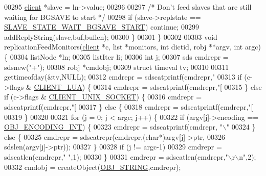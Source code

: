 \begin{DoxyCode}
{{{{{00295         \hyperlink{structclient}{client} *slave = ln->value;
00296 
00297         \textcolor{comment}{/* Don't feed slaves that are still waiting for BGSAVE to start */}
00298         \textcolor{keywordflow}{if} (slave->replstate == \hyperlink{server_8h_a170ee2dd8cfefaf0d112edcc3152f8d7}{SLAVE\_STATE\_WAIT\_BGSAVE\_START}) \textcolor{keywordflow}{continue};
00299         addReplyString(slave,buf,buflen);
00300     \}
00301 \}
00302 
00303 \textcolor{keywordtype}{void} replicationFeedMonitors(\hyperlink{structclient}{client} *c, list *monitors, \textcolor{keywordtype}{int} dictid, robj **argv, \textcolor{keywordtype}{int} argc) \{
00304     listNode *ln;
00305     listIter li;
00306     \textcolor{keywordtype}{int} j;
00307     sds cmdrepr = sdsnew(\textcolor{stringliteral}{"+"});
00308     robj *cmdobj;
00309     \textcolor{keyword}{struct} timeval tv;
00310 
00311     gettimeofday(&tv,NULL);
00312     cmdrepr = sdscatprintf(cmdrepr,\textcolor{stringliteral}{"%
00313     \textcolor{keywordflow}{if} (c->flags & \hyperlink{server_8h_af9d0b0f45ef2c1fd29ac714a300de706}{CLIENT\_LUA}) \{
00314         cmdrepr = sdscatprintf(cmdrepr,\textcolor{stringliteral}{"[%
00315     \} \textcolor{keywordflow}{else} \textcolor{keywordflow}{if} (c->flags & \hyperlink{server_8h_ae19f45757ef3ffb2f3abb86cbc3b67a2}{CLIENT\_UNIX\_SOCKET}) \{
00316         cmdrepr = sdscatprintf(cmdrepr,\textcolor{stringliteral}{"[%
00317     \} \textcolor{keywordflow}{else} \{
00318         cmdrepr = sdscatprintf(cmdrepr,\textcolor{stringliteral}{"[%
00319     \}
00320 
00321     \textcolor{keywordflow}{for} (j = 0; j < argc; j++) \{
00322         \textcolor{keywordflow}{if} (argv[j]->encoding == \hyperlink{server_8h_ae934cf008a0be0ef009c92c2d006a816}{OBJ\_ENCODING\_INT}) \{
00323             cmdrepr = sdscatprintf(cmdrepr, \textcolor{stringliteral}{"\(\backslash\)"%
00324         \} \textcolor{keywordflow}{else} \{
00325             cmdrepr = sdscatrepr(cmdrepr,(\textcolor{keywordtype}{char}*)argv[j]->ptr,
00326                         sdslen(argv[j]->ptr));
00327         \}
00328         \textcolor{keywordflow}{if} (j != argc-1)
00329             cmdrepr = sdscatlen(cmdrepr,\textcolor{stringliteral}{" "},1);
00330     \}
00331     cmdrepr = sdscatlen(cmdrepr,\textcolor{stringliteral}{"\(\backslash\)r\(\backslash\)n"},2);
00332     cmdobj = createObject(\hyperlink{server_8h_a65236ea160f69cdef33ec942092af88f}{OBJ\_STRING},cmdrepr);
}}}}}}}}}}
\end{DoxyCode}

